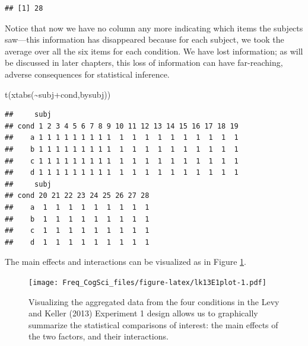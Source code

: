 \documentclass[
  12pt,
]{krantz}
\newenvironment{Shaded}{\begin{snugshade}}{\end{snugshade}}
\newcommand{\FunctionTok}[1]{\textcolor[rgb]{0.00,0.00,0.00}{#1}}
\newcommand{\NormalTok}[1]{#1}
\newcommand{\SpecialCharTok}[1]{\textcolor[rgb]{0.00,0.00,0.00}{#1}}
\newcommand{\StringTok}[1]{\textcolor[rgb]{0.31,0.60,0.02}{#1}}
\theoremstyle{definition}
\theoremstyle{definition}
\theoremstyle{definition}
\theoremstyle{definition}
\theoremstyle{remark}
\begin{document}
\begin{Shaded}
\end{Shaded}

\begin{verbatim}
## [1] 28
\end{verbatim}

Notice that now we have no column any more indicating which items the subjects saw---this information has disappeared because for each subject, we took the average over all the six items for each condition. We have lost information; as will be discussed in later chapters, this loss of information can have far-reaching, adverse consequences for statistical inference.

\begin{Shaded}
\begin{Highlighting}[]
\FunctionTok{t}\NormalTok{(}\FunctionTok{xtabs}\NormalTok{(}\SpecialCharTok{\textasciitilde{}}\NormalTok{subj}\SpecialCharTok{+}\NormalTok{cond,bysubj))}
\end{Highlighting}
\end{Shaded}

\begin{verbatim}
##     subj
## cond 1 2 3 4 5 6 7 8 9 10 11 12 13 14 15 16 17 18 19
##    a 1 1 1 1 1 1 1 1 1  1  1  1  1  1  1  1  1  1  1
##    b 1 1 1 1 1 1 1 1 1  1  1  1  1  1  1  1  1  1  1
##    c 1 1 1 1 1 1 1 1 1  1  1  1  1  1  1  1  1  1  1
##    d 1 1 1 1 1 1 1 1 1  1  1  1  1  1  1  1  1  1  1
##     subj
## cond 20 21 22 23 24 25 26 27 28
##    a  1  1  1  1  1  1  1  1  1
##    b  1  1  1  1  1  1  1  1  1
##    c  1  1  1  1  1  1  1  1  1
##    d  1  1  1  1  1  1  1  1  1
\end{verbatim}

The main effects and interactions can be visualized as in Figure \ref{fig:lk13E1plot}.

\begin{figure}
\centering
\texttt{[image: Freq\_CogSci\_files/figure-latex/lk13E1plot-1.pdf]}
\caption{\label{fig:lk13E1plot}Visualizing the aggregated data from the four conditions in the Levy and Keller (2013) Experiment 1 design allows us to graphically summarize the statistical comparisons of interest: the main effects of the two factors, and their interactions.}
\end{figure}
\end{document}
